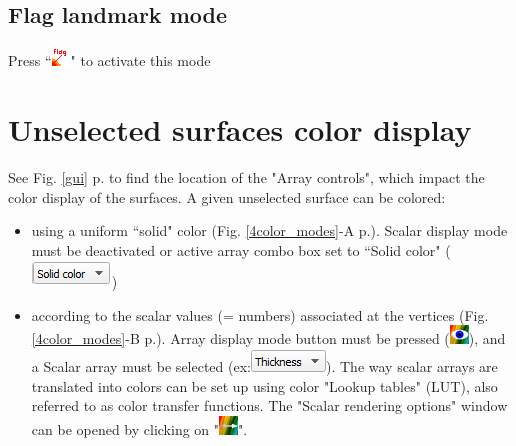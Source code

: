 \subsection{Flag landmark mode}	
Press ``\includegraphics[scale=0.7]{images/04/flag_landmarks.png}" to activate this mode


 \section{Unselected surfaces color display}
See Fig. \ref{gui} p.\pageref{gui} to find the location of the "Array controls", which impact the color display of the surfaces.
 A given unselected surface can be colored: 
\begin{itemize}
\item using a uniform ``solid" color (Fig. \ref{4color_modes}-A p.\pageref{4color_modes}). Scalar display mode must be deactivated or active array combo box set to ``Solid color" (\includegraphics[scale=0.5]{images/04/scalarcombo_solidcolor.png})
\item	according to the scalar values (= numbers) associated at the vertices (Fig. \ref{4color_modes}-B p.\pageref{4color_modes}). Array display mode button must be pressed (\includegraphics[scale=0.7]{images/04/show_color_scale.png}), and a Scalar array must be selected (ex:\includegraphics[scale=0.5]{images/04/scalarcombo_scalar.png}). The way scalar arrays are translated into colors can be set up using color "Lookup tables" (LUT), also referred to as color transfer functions. The "Scalar rendering options" window can be opened by clicking on "\includegraphics[scale=0.7]{images/04/color_scale_edit.png}". 

\end{itemize}
